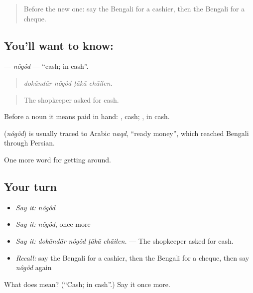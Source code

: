 \label{lesson:BN-C414-nogod}



\begin{quote}
Before the new one: say the Bengali for a cashier, then the Bengali for a cheque.
\end{quote}

\subsection*{You'll want to know: }
\textbf{} — \emph{nôgôd} — \textquotedblleft{}cash; in cash\textquotedblright{}.

\begin{quote}
   
\end{quote}

\begin{quote}
\emph{dokāndār nôgôd ṭākā chāilen.}
\end{quote}

\begin{quote}
The shopkeeper asked for cash.
\end{quote}

Before a noun it means paid in hand:  , cash; , in cash.

\begin{cousinweb}
\textbf{} (\emph{nôgôd}) is usually traced to Arabic \emph{naqd}, \textquotedblleft{}ready money\textquotedblright{}, which reached Bengali through Persian.
\end{cousinweb}

\begin{grammarlens}[title={What you've built}]
One more word for getting around.
\end{grammarlens}

\subsection*{Your turn}
\begin{itemize}
\raggedright
  \item \emph{Say it:} \emph{nôgôd}
  \item \emph{Say it:} \emph{nôgôd}, once more
  \item \emph{Say it:} \emph{dokāndār nôgôd ṭākā chāilen.} — The shopkeeper asked for cash.
  \item \emph{Recall:} say the Bengali for a cashier, then the Bengali for a cheque, then say \emph{nôgôd} again
\end{itemize}

\begin{tcolorbox}[breakable,colback=teal!4,colframe=teal!35!black,title={Before you move on}]
What does  mean? (\textquotedblleft{}Cash; in cash\textquotedblright{}.) Say it once more.
\end{tcolorbox}
